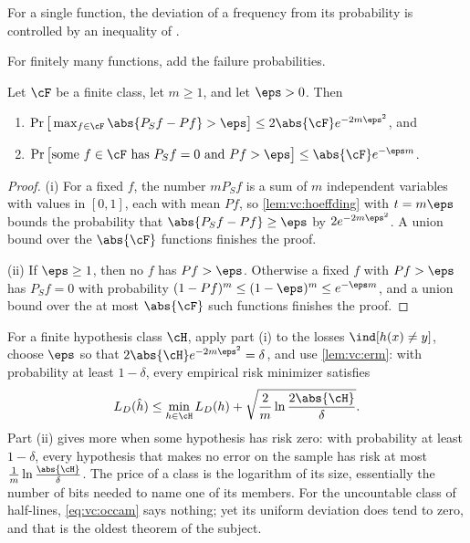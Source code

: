 \begin{refsection}
For a single function, the deviation of a frequency from its probability is controlled by an inequality of \textcite{Hoeffding1963}.


For finitely many functions, add the failure probabilities.

\begin{theorem}\label{thm:vc:finite}
Let $\cF$ be a finite class, let $m\ge1$, and let $\eps>0$. Then
\begin{enumerate}
\item $\Pr\big[\max_{f\in\cF}\abs{P_Sf-Pf}>\eps\big]\le2\abs{\cF}e^{-2m\eps^2}$, and
\item $\Pr\big[\text{some } f\in\cF \text{ has } P_Sf=0 \text{ and } Pf>\eps\big]\le\abs{\cF}e^{-\eps m}$.
\end{enumerate}
\end{theorem}

\begin{proof}
(i) For a fixed $f$, the number $mP_Sf$ is a sum of $m$ independent variables with values in $[0,1]$, each with mean $Pf$, so \cref{lem:vc:hoeffding} with $t = m\eps$ bounds the probability that $\abs{P_Sf-Pf}\ge\eps$ by $2e^{-2m\eps^2}$. A union bound over the $\abs{\cF}$ functions finishes the proof.

(ii) If $\eps\ge1$, then no $f$ has $Pf>\eps$. Otherwise a fixed $f$ with $Pf>\eps$ has $P_Sf = 0$ with probability $(1-Pf)^m\le(1-\eps)^m\le e^{-\eps m}$, and a union bound over the at most $\abs{\cF}$ such functions finishes the proof.
\end{proof}

For a finite hypothesis class $\cH$, apply part (i) to the losses $\ind[h(x)\ne y]$, choose $\eps$ so that $2\abs{\cH}e^{-2m\eps^2} = \delta$, and use \cref{lem:vc:erm}: with probability at least $1-\delta$, every empirical risk minimizer satisfies
\begin{equation}\label{eq:vc:occam}
  L_D(\hat h)\le\min_{h\in\cH}L_D(h)+\sqrt{\frac2m\ln\frac{2\abs{\cH}}{\delta}} .
\end{equation}
Part (ii) gives more when some hypothesis has risk zero: with probability at least $1-\delta$, every hypothesis that makes no error on the sample has risk at most $\frac1m\ln\frac{\abs{\cH}}{\delta}$. The price of a class is the logarithm of its size, essentially the number of bits needed to name one of its members. For the uncountable class of half-lines, \eqref{eq:vc:occam} says nothing; yet its uniform deviation does tend to zero, and that is the oldest theorem of the subject.


\end{refsection}
